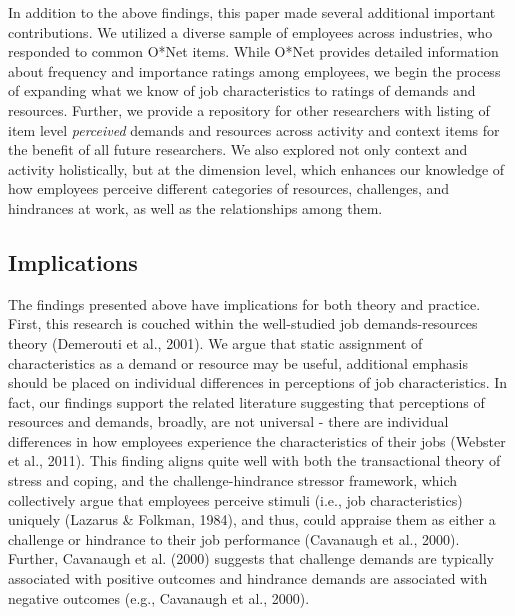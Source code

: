 \documentclass[
  man,mask]{apa7}
\begin{document}
In addition to the above findings, this paper made several additional important contributions. We utilized a diverse sample of employees across industries, who responded to common O*Net items. While O*Net provides detailed information about frequency and importance ratings among employees, we begin the process of expanding what we know of job characteristics to ratings of demands and resources. Further, we provide a repository for other researchers with listing of item level \emph{perceived} demands and resources across activity and context items for the benefit of all future researchers. We also explored not only context and activity holistically, but at the dimension level, which enhances our knowledge of how employees perceive different categories of resources, challenges, and hindrances at work, as well as the relationships among them.

\hypertarget{implications}{%
\subsection{Implications}\label{implications}}

The findings presented above have implications for both theory and practice. First, this research is couched within the well-studied job demands-resources theory (Demerouti et al., 2001). We argue that static assignment of characteristics as a demand or resource may be useful, additional emphasis should be placed on individual differences in perceptions of job characteristics. In fact, our findings support the related literature suggesting that perceptions of resources and demands, broadly, are not universal - there are individual differences in how employees experience the characteristics of their jobs (Webster et al., 2011). This finding aligns quite well with both the transactional theory of stress and coping, and the challenge-hindrance stressor framework, which collectively argue that employees perceive stimuli (i.e., job characteristics) uniquely (Lazarus \& Folkman, 1984), and thus, could appraise them as either a challenge or hindrance to their job performance (Cavanaugh et al., 2000). Further, Cavanaugh et al. (2000) suggests that challenge demands are typically associated with positive outcomes and hindrance demands are associated with negative outcomes (e.g., Cavanaugh et al., 2000).
\end{document}
